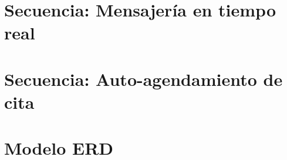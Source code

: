 \section{Secuencia: Mensajería en tiempo real}


\section{Secuencia: Auto-agendamiento de cita}


\section{Modelo ERD}

